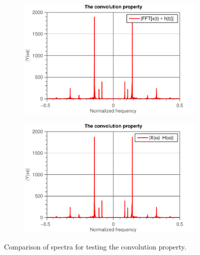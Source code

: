 \documentclass[11pt,titlepage]{report}
\begin{document}
\begin{figure}[H]
	\centering
	\begin{subfigure}{0.49\textwidth}
		\includegraphics[width=\textwidth]{../../deliverable-7-resources/figures/ass-1/report-7/ass-1-report-7-convolution.pdf}
	\end{subfigure}
	\begin{subfigure}{0.49\textwidth}
		\includegraphics[width=\textwidth]{../../deliverable-7-resources/figures/ass-1/report-7/ass-1-report-7-multiplication.pdf}
	\end{subfigure}
	\caption{Comparison of spectra for testing the convolution property.}
	\label{fig:rep7-convolution}
\end{figure}
\end{document}
